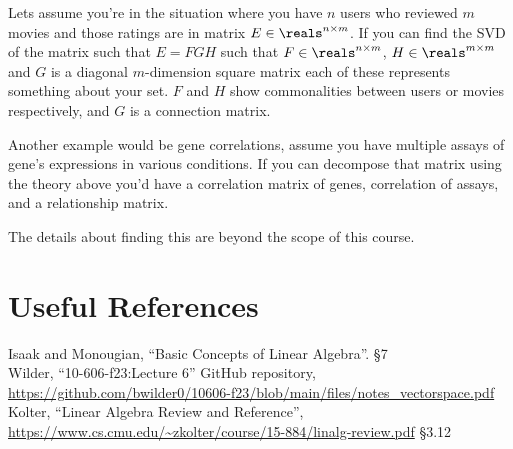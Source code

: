  Lets assume you're in the situation where you have $n$ users who reviewed $m$ movies and those ratings are in matrix $E\in\reals^{n\times m}$. 
 If you can find the SVD of the matrix such that $E=FGH$ such that $F\in\reals^{n\times m}$, $H\in\reals^{m\times m}$ and $G$ is a diagonal $m$-dimension square matrix each of these represents something about your set. 
 $F$ and $H$ show commonalities between users or movies respectively, 
 and $G$ is a connection matrix. 
 
 Another example would be gene correlations, assume you have multiple assays of gene's expressions in various conditions. 
 If you can decompose that matrix using the theory above you'd have a correlation matrix of genes, correlation of assays, and a relationship matrix. 
 
 
 The details about finding this are beyond the scope of this course. 


\section*{Useful References}
Isaak and Monougian, ``Basic Concepts of Linear Algebra''. \S 7\\
Wilder, ``10-606-f23:Lecture 6'' GitHub repository, \url{https://github.com/bwilder0/10606-f23/blob/main/files/notes_vectorspace.pdf}\\
Kolter, ``Linear Algebra Review and Reference'', \url{https://www.cs.cmu.edu/~zkolter/course/15-884/linalg-review.pdf} \S 3.12


